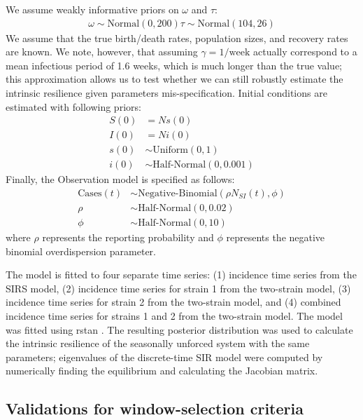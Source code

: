 \documentclass[12pt]{article}
\begin{document}
We assume weakly informative priors on $\omega$ and $\tau$:
\begin{align}
\omega \sim \mathrm{Normal}(0, 200)
\tau \sim \mathrm{Normal}(104, 26)
\end{align}
We assume that the true birth/death rates, population sizes, and recovery rates are known.
We note, however, that assuming $\gamma=1/\mathrm{week}$ actually correspond to a mean infectious period of 1.6 weeks, which is much longer than the true value; this approximation allows us to test whether we can still robustly estimate the intrinsic resilience given parameters mis-specification.
Initial conditions are estimated with following priors:
\begin{align}
S(0) &= N s(0)\\
I(0) &= N i(0)\\
s(0) &\sim \textrm{Uniform}(0, 1)\\
i(0) &\sim \textrm{Half-Normal}(0, 0.001)
\end{align}
Finally, the Observation model is specified as follows:
\begin{align}
\textrm{Cases}(t) &\sim \textrm{Negative-Binomial}(\rho N_{SI}(t), \phi)\\
\rho &\sim \textrm{Half-Normal}(0, 0.02)\\
\phi &\sim \textrm{Half-Normal}(0, 10)
\end{align}
where $\rho$ represents the reporting probability and $\phi$ represents the negative binomial overdispersion parameter.

The model is fitted to four separate time series: (1) incidence time series from the SIRS model, (2) incidence time series for strain 1 from the two-strain model, (3) incidence time series for strain 2 from the two-strain model, and (4) combined incidence time series for strains 1 and 2 from the two-strain model.
The model was fitted using rstan \citep{carpenter2017stan,rstan}.
The resulting posterior distribution was used to calculate the intrinsic resilience of the seasonally unforced system with the same parameters;
eigenvalues of the discrete-time SIR model were computed by numerically finding the equilibrium and calculating the Jacobian matrix.

\subsection*{Validations for window-selection criteria}
\end{document}
